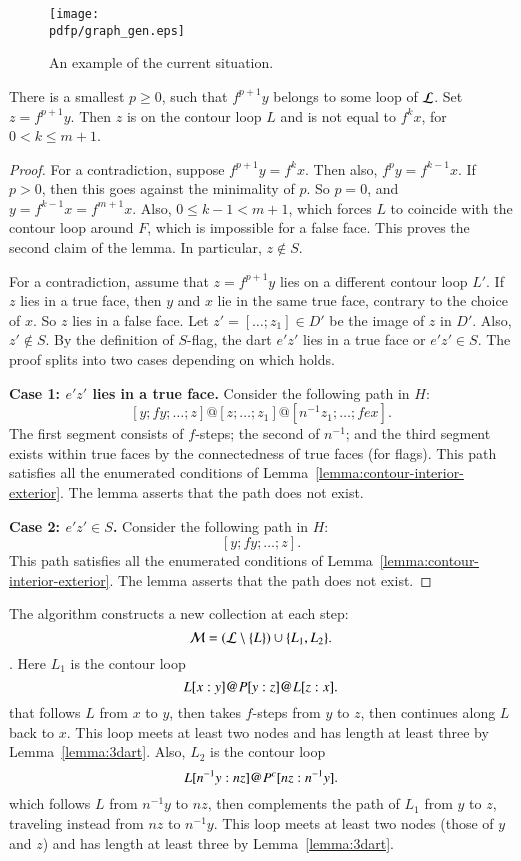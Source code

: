 \begin{figure}[htb]
  \centering
  \texttt{[image: \\pdfp/graph\_gen.eps]}
  \caption{An example of the current situation.}
  \label{fig:graph-gen}
\end{figure}


\begin{lemma}  There is a smallest $p\ge0$, such that $f^{p+1} y$ belongs to some loop of ${\cal L}$.  Set $z=f^{p+1} y$.  Then   $z$ is on the contour loop $L$ and is not equal to $f^k x$, for $0 < k \le {m+1}$.
\end{lemma}

\begin{proof} 
For a contradiction, suppose $f^{p+1} y = f^k x$. Then also, $f^p y = f^{k-1} x$.  If $p>0$, then this goes against the minimality of $p$.  So $p=0$, and $y=f^{k-1} x = f^{m+1} x$.  Also, $0\le k-1 < {m+1}$, which forces $L$ to coincide with the contour loop around $F$, which is impossible for a false face.  This proves the second claim of the lemma.  In particular, $z\not\in S$.

For a contradiction, assume that $z = f^{p+1} y$ lies on a different contour loop $L'$.  If $z$ lies in a true face, then $y$ and $x$ lie in the same true face, contrary to the choice of $x$.  So $z$ lies in a false face.  Let $z' = [\ldots;z_1]\in D'$ be the image of $z$ in $D'$.  Also,  $z'\not\in S$.  By the definition of $S$-flag, the dart $e'z'$ lies in a true face or $e'z'\in S$.  The proof splits into two cases depending on which holds.

{\bf Case 1: $e'z'$ lies in a true face.}  Consider the following path in $H$:
$$
[y;fy;\ldots;z] @ [z;\ldots;z_1] @ [n^{-1} z_1;\ldots;f e x].
$$
The first segment consists of $f$-steps; the second of $n^{-1}$; and the third segment exists within true faces by the connectedness of true faces (for flags).  This
path satisfies all the enumerated conditions of Lemma~\ref{lemma:contour-interior-exterior}.  The lemma asserts that the path does not exist.

{\bf Case 2: $e'z'\in S$.}   Consider the following path in $H$:
$$
[y;f y;\ldots;z].
$$
 This
path satisfies all the enumerated conditions of Lemma~\ref{lemma:contour-interior-exterior}.  The lemma asserts that the path does not exist.
\end{proof}


The algorithm constructs a new collection at each step:
$${\cal M} = ({\cal L}\setminus \{L\}) \cup \{L_1,L_2\}.$$. 
Here $L_1$ is the contour loop
$$
L[x:y] {\operatorname{@}} P[y:z] {\operatorname{@}} L[z:x].
$$
that follows $L$ from $x$ to $y$, then takes $f$-steps from $y$ to $z$, then continues along $L$ back to $x$.  This loop meets at least two nodes and has length at least three by Lemma~\ref{lemma:3dart}. Also, $L_2$ is the contour loop
$$
L[n^{-1}y:n z] {\operatorname{@}} P^c[n z:n^{-1}y].
$$
which follows $L$ from $n^{-1} y$ to $n z$, then complements the path of $L_1$ from $y$ to $z$, traveling instead from $n z$ to $n^{-1} y$.  This loop meets at least two nodes (those of $y$ and $z$) and has length at least three by Lemma~\ref{lemma:3dart}.

